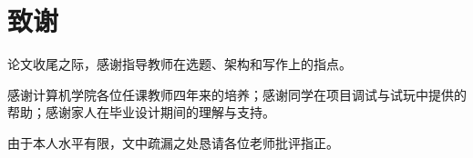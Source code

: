 \chapter*{致\quad 谢}

论文收尾之际，感谢指导教师在选题、架构和写作上的指点。

感谢计算机学院各位任课教师四年来的培养；感谢同学在项目调试与试玩中提供的帮助；感谢家人在毕业设计期间的理解与支持。

由于本人水平有限，文中疏漏之处恳请各位老师批评指正。
